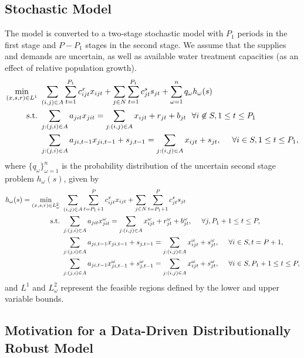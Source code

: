 \documentclass[opre,nonblindrev]{informs3} %
\newcommand{\st}{\mbox{s.t.}}
\begin{document}
\subsection{Stochastic Model}

The model is converted to a two-stage stochastic model with $P_1$ periods in the first stage and $P-P_1$ stages in the second stage.
We assume that the supplies and demands are uncertain, as well as available water treatment capacities (as an effect of relative population growth).
\begin{align}
	\min_{(x,s,r) \in L^1} \ & \sum_{(i,j) \in A} \sum_{t=1}^{P_1} c_{ijt}^x x_{ijt} + \sum_{j \in N} \sum_{t=1}^{P_1} c_{jt}^s s_{jt} + \sum_{\omega=1}^n q_\omega h_\omega(s) \label{eq:gen_network_two_stage} \\
	\st \ & \sum_{j : (j,i) \in A} a_{jit} x_{jit} = \sum_{j : (i,j) \in A} x_{ijt} + r_{jt} + b_{jt} \ \ \forall i \not\in S, 1 \leq t \leq P_1 \notag \\
	& \sum_{j : (j,i) \in A} a_{ji,t-1} x_{ji,t-1} + s_{j,t-1} = \sum_{j : (i,j) \in A} x_{ijt} + s_{jt},\ \ \ \ \forall i \in S, 1 \leq t \leq P_1, \notag
\end{align}
where $\{q_\omega\}_{\omega = 1}^n$ is the probability distribution of the uncertain second stage problem $h_\omega(s)$, given by
\begin{align}
	h_\omega(s) = \min_{(x,s,r) \in L^2_\omega} \ & \sum_{(i,j) \in A} \sum_{t=P_1+1}^{P} c_{ijt}^x x_{ijt} + \sum_{j \in N} \sum_{t=P_1+1}^{P} c_{jt}^s s_{jt} \label{eq:gen_network_second_stage} \\
	\st \ & \sum_{j : (j,i) \in A} a_{jit} x_{jit}^\omega = \sum_{j : (i,j) \in A} x_{ijt}^\omega + r_{jt}^\omega + b_{jt}^\omega, \ \ \ \ \forall j, P_1+1 \leq t \leq P, \notag \\
	& \sum_{j : (j,i) \in A} a_{ji,t-1} x_{ji,t-1} + s_{j,t-1} = \sum_{j : (i,j) \in A} x_{ijt}^\omega + s_{jt}^\omega,\ \ \ \ \forall i \in S, t = P+1, \notag \\
	& \sum_{j : (j,i) \in A} a_{ji,t-1} x_{ji,t-1}^\omega + s_{j,t-1}^\omega = \sum_{j : (i,j) \in A} x_{ijt}^\omega + s_{jt}^\omega,\ \ \ \ \forall i \in S, P_1+1 \leq t \leq P, \notag
\end{align}
and $L^1$ and $L^2_\omega$ represent the feasible regions defined by the lower and upper variable bounds.

\subsection{Motivation for a Data-Driven Distributionally Robust Model}
\end{document}

